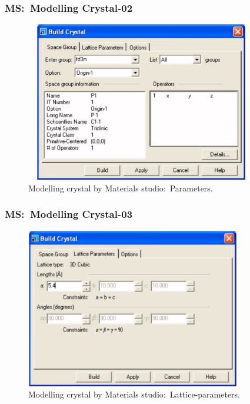 \frame
{
	\frametitle{\textrm{MS:~Modelling Crystal-02}}
\begin{figure}[h!]
\centering
\vspace*{-0.15in}
\includegraphics[height=2.75in,width=4.00in,viewport=0 0 1090 814,clip]{Figures/MS-New_Project-07.png}
\caption{\tiny \textrm{Modelling crystal by Materials studio:~Parameters.}}%
\label{MS-Modelling-Crystal-02}
\end{figure}
}

\frame
{
	\frametitle{\textrm{MS:~Modelling Crystal-03}}
\begin{figure}[h!]
\centering
\vspace*{-0.15in}
\includegraphics[height=2.75in,width=3.70in,viewport=0 0 818 616,clip]{Figures/MS-New_Project-08.png}
\caption{\tiny \textrm{Modelling crystal by Materials studio:~Lattice-parameters.}}%
\label{MS-Modelling-Crystal-03}
\end{figure}
}


